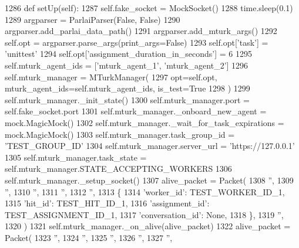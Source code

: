 \begin{DoxyCode}
1286     \textcolor{keyword}{def }setUp(self):
1287         self.fake\_socket = MockSocket()
1288         time.sleep(0.1)
1289         argparser = ParlaiParser(\textcolor{keyword}{False}, \textcolor{keyword}{False})
1290         argparser.add\_parlai\_data\_path()
1291         argparser.add\_mturk\_args()
1292         self.opt = argparser.parse\_args(print\_args=\textcolor{keyword}{False})
1293         self.opt[\textcolor{stringliteral}{'task'}] = \textcolor{stringliteral}{'unittest'}
1294         self.opt[\textcolor{stringliteral}{'assignment\_duration\_in\_seconds'}] = 6
1295         self.mturk\_agent\_ids = [\textcolor{stringliteral}{'mturk\_agent\_1'}, \textcolor{stringliteral}{'mturk\_agent\_2'}]
1296         self.mturk\_manager = MTurkManager(
1297             opt=self.opt, mturk\_agent\_ids=self.mturk\_agent\_ids, is\_test=\textcolor{keyword}{True}
1298         )
1299         self.mturk\_manager.\_init\_state()
1300         self.mturk\_manager.port = self.fake\_socket.port
1301         self.mturk\_manager.\_onboard\_new\_agent = mock.MagicMock()
1302         self.mturk\_manager.\_wait\_for\_task\_expirations = mock.MagicMock()
1303         self.mturk\_manager.task\_group\_id = \textcolor{stringliteral}{'TEST\_GROUP\_ID'}
1304         self.mturk\_manager.server\_url = \textcolor{stringliteral}{'https://127.0.0.1'}
1305         self.mturk\_manager.task\_state = self.mturk\_manager.STATE\_ACCEPTING\_WORKERS
1306         self.mturk\_manager.\_setup\_socket()
1307         alive\_packet = Packet(
1308             \textcolor{stringliteral}{''},
1309             \textcolor{stringliteral}{''},
1310             \textcolor{stringliteral}{''},
1311             \textcolor{stringliteral}{''},
1312             \textcolor{stringliteral}{''},
1313             \{
1314                 \textcolor{stringliteral}{'worker\_id'}: TEST\_WORKER\_ID\_1,
1315                 \textcolor{stringliteral}{'hit\_id'}: TEST\_HIT\_ID\_1,
1316                 \textcolor{stringliteral}{'assignment\_id'}: TEST\_ASSIGNMENT\_ID\_1,
1317                 \textcolor{stringliteral}{'conversation\_id'}: \textcolor{keywordtype}{None},
1318             \},
1319             \textcolor{stringliteral}{''},
1320         )
1321         self.mturk\_manager.\_on\_alive(alive\_packet)
1322         alive\_packet = Packet(
1323             \textcolor{stringliteral}{''},
1324             \textcolor{stringliteral}{''},
1325             \textcolor{stringliteral}{''},
1326             \textcolor{stringliteral}{''},
1327             \textcolor{stringliteral}{''},

\end{DoxyCode}
